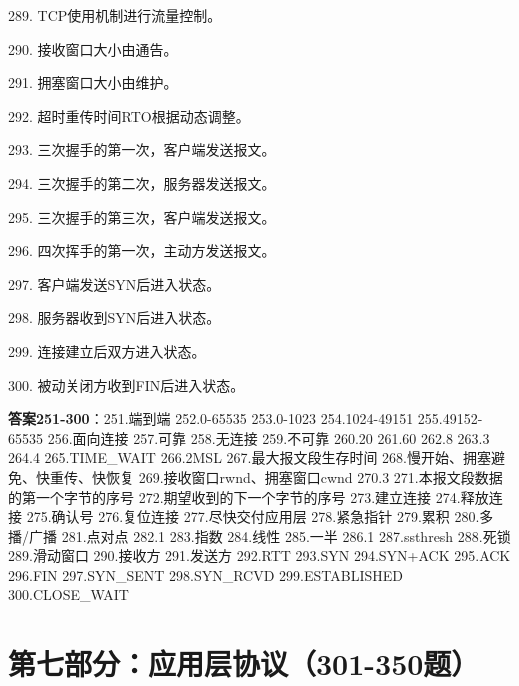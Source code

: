 289. TCP使用\underline{\hspace{2cm}}机制进行流量控制。

290. 接收窗口大小由\underline{\hspace{2cm}}通告。

291. 拥塞窗口大小由\underline{\hspace{2cm}}维护。

292. 超时重传时间RTO根据\underline{\hspace{2cm}}动态调整。

293. 三次握手的第一次，客户端发送\underline{\hspace{2cm}}报文。

294. 三次握手的第二次，服务器发送\underline{\hspace{2cm}}报文。

295. 三次握手的第三次，客户端发送\underline{\hspace{2cm}}报文。

296. 四次挥手的第一次，主动方发送\underline{\hspace{2cm}}报文。

297. 客户端发送SYN后进入\underline{\hspace{2cm}}状态。

298. 服务器收到SYN后进入\underline{\hspace{2cm}}状态。

299. 连接建立后双方进入\underline{\hspace{2cm}}状态。

300. 被动关闭方收到FIN后进入\underline{\hspace{2cm}}状态。

\textbf{答案251-300}：251.端到端 252.0-65535 253.0-1023 254.1024-49151 255.49152-65535 256.面向连接 257.可靠 258.无连接 259.不可靠 260.20 261.60 262.8 263.3 264.4 265.TIME\_WAIT 266.2MSL 267.最大报文段生存时间 268.慢开始、拥塞避免、快重传、快恢复 269.接收窗口rwnd、拥塞窗口cwnd 270.3 271.本报文段数据的第一个字节的序号 272.期望收到的下一个字节的序号 273.建立连接 274.释放连接 275.确认号 276.复位连接 277.尽快交付应用层 278.紧急指针 279.累积 280.多播/广播 281.点对点 282.1 283.指数 284.线性 285.一半 286.1 287.ssthresh 288.死锁 289.滑动窗口 290.接收方 291.发送方 292.RTT 293.SYN 294.SYN+ACK 295.ACK 296.FIN 297.SYN\_SENT 298.SYN\_RCVD 299.ESTABLISHED 300.CLOSE\_WAIT


\section{第七部分：应用层协议（301-350题）}

